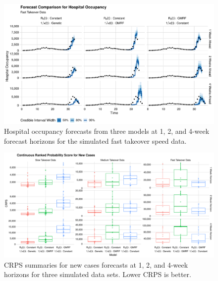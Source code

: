 \begin{figure}
    \centering
    \includegraphics[width=1.0\columnwidth]{simulated_forecast_comparison_data_hospitalizations_fast_plot}
\caption[Hospital occupancy forecasts for simulated fast takeover speed data.]{Hospital occupancy forecasts from three models at 1, 2, and 4-week forecast horizons for the simulated fast takeover speed data.}
    \label{ch_5:fig:simulated_forecast_comparison_data_hospitalizations_fast_plot}
\end{figure}

\begin{figure}
    \centering
    \includegraphics[width=1.0\columnwidth]{simulated_crps_comparison_boxplot_data_new_cases_plot}
    \caption{CRPS summaries for new cases forecasts at 1, 2, and 4-week horizons for three simulated data sets. Lower CRPS is better.}
    \label{ch_5:fig:simulated_crps_comparison_boxplot_data_new_cases_plot}
\end{figure}

